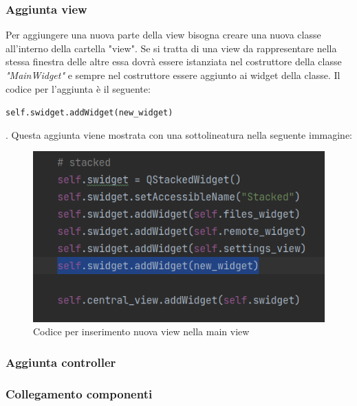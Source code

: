 \subsubsection{Aggiunta view}
Per aggiungere una nuova parte della view bisogna creare una nuova classe all'interno della cartella "view". Se si tratta di una view da rappresentare nella stessa finestra delle altre essa dovrà essere istanziata nel costruttore della classe \textit{"MainWidget"} e sempre nel costruttore essere aggiunto ai widget della classe. Il codice per l'aggiunta è il seguente: \newline{} \centerline{ \texttt{self.swidget.addWidget(new\_widget)}}.
Questa aggiunta viene mostrata con una sottolineatura nella seguente immagine:
\begin{figure}[H]
    \centering
    \includegraphics[scale = 0.75]{components/img/codice-nuova-view-su-main-view.png}
    \caption{Codice per inserimento nuova view nella main view}
    \label{fig:Codice per inserimento nuova view nella main view}
\end{figure}



\subsubsection{Aggiunta controller}

\subsubsection{Collegamento componenti}